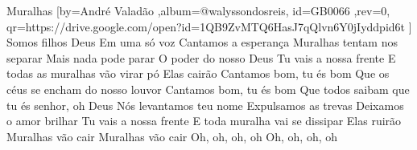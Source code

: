 \beginsong
{Muralhas %
}[by={André Valadão %
},album={@walyssondosreis},
id={GB0066 %
},rev={0}, %
qr={https://drive.google.com/open?id=1QB9ZvMTQ6HasJ7qQlvn6Y0jIyddpid6t %
}]
\beginverse*
Somos filhos Deus
Em uma só voz
Cantamos a esperança
Muralhas tentam nos separar
Mais nada pode parar
O poder do nosso Deus
Tu vais a nossa frente
E todas as muralhas vão virar pó
Elas cairão
\endverse
\beginchorus
Cantamos bom, tu és bom
Que os céus se encham do nosso louvor
Cantamos bom, tu és bom
Que todos saibam que tu és senhor, oh Deus
\endchorus
\beginverse*
Nós levantamos teu nome
Expulsamos as trevas
Deixamos o amor brilhar
Tu vais a nossa frente
E toda muralha vai se dissipar
Elas ruirão
\endverse
\beginverse*
Muralhas vão cair
Muralhas vão cair
Oh, oh, oh, oh
Oh, oh, oh, oh
\endverse

